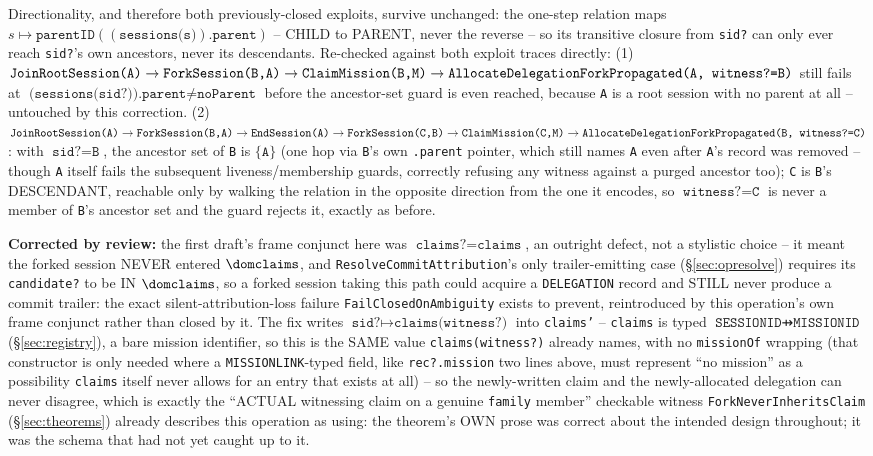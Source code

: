 \documentclass[a4paper,10pt,fleqn]{article}
\newcommand{\field}[1]{\texttt{#1}}
\begin{document}
Directionality, and therefore both previously-closed exploits, survive
unchanged: the one-step relation maps $s \mapsto \field{parentID}((\field{sessions(s)}).\field{parent})$
-- CHILD to PARENT, never the reverse -- so its transitive closure from
\field{sid?} can only ever reach \field{sid?}'s own ancestors, never
its descendants. Re-checked against both exploit traces directly: (1)
$\field{JoinRootSession(A)} \to \field{ForkSession(B,A)} \to
\field{ClaimMission(B,M)} \to
\field{AllocateDelegationForkPropagated(A, \field{witness?}=B)}$ still
fails at $\field{(sessions(sid?)).parent} \neq \field{noParent}$ before
the ancestor-set guard is even reached, because \field{A} is a root
session with no parent at all -- untouched by this correction. (2)
$\field{JoinRootSession(A)} \to \field{ForkSession(B,A)} \to
\field{EndSession(A)} \to \field{ForkSession(C,B)} \to
\field{ClaimMission(C,M)} \to
\field{AllocateDelegationForkPropagated(B, \field{witness?}=C)}$: with
$\field{sid?} = \field{B}$, the ancestor set of \field{B} is $\{
\field{A} \}$ (one hop via \field{B}'s own \field{.parent} pointer,
which still names \field{A} even after \field{A}'s record was removed
-- though \field{A} itself fails the subsequent liveness/membership
guards, correctly refusing any witness against a purged ancestor too);
\field{C} is \field{B}'s DESCENDANT, reachable only by walking the
relation in the opposite direction from the one it encodes, so
$\field{witness?} = \field{C}$ is never a member of \field{B}'s
ancestor set and the guard rejects it, exactly as before.

\textbf{Corrected by review:} the first draft's frame conjunct here was
$\field{claims?} = \field{claims}$, an outright defect, not a stylistic
choice -- it meant the forked session NEVER entered $\dom
\field{claims}$, and \field{ResolveCommitAttribution}'s only
trailer-emitting case (\S\ref{sec:opresolve}) requires its
\field{candidate?} to be IN $\dom \field{claims}$, so a forked session
taking this path could acquire a \field{DELEGATION} record and STILL
never produce a commit trailer: the exact silent-attribution-loss
failure \field{FailClosedOnAmbiguity} exists to prevent, reintroduced
by this operation's own frame conjunct rather than closed by it. The
fix writes $\field{sid?} \mapsto \field{claims(witness?)}$ into
\field{claims'} -- \field{claims} is typed $\field{SESSIONID} \pfun
\field{MISSIONID}$ (\S\ref{sec:registry}), a bare mission identifier,
so this is the SAME value \field{claims(witness?)} already names, with
no \field{missionOf} wrapping (that constructor is only needed where a
\field{MISSIONLINK}-typed field, like \field{rec?.mission} two lines
above, must represent ``no mission'' as a possibility \field{claims}
itself never allows for an entry that exists at all) -- so the
newly-written claim and the newly-allocated delegation can never
disagree, which is exactly the ``ACTUAL witnessing claim on a genuine
\field{family} member'' checkable witness \field{ForkNeverInheritsClaim}
(\S\ref{sec:theorems}) already describes this operation as using: the
theorem's OWN prose was correct about the intended design throughout;
it was the schema that had not yet caught up to it.
\end{document}
